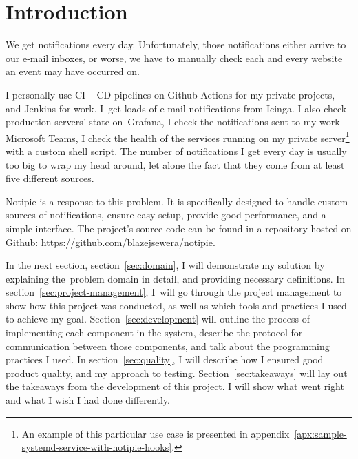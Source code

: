 \section{Introduction}\label{sec:introduction}

We get notifications every day.
Unfortunately,
those notifications either arrive
to our e-mail inboxes,
or worse,
we have to manually check
each and every website an event may have occurred on.

I personally use \ac{CI} -- \ac{CD} pipelines
on Github Actions for my private projects,
and Jenkins for work.
I~get loads of e-mail notifications from Icinga.
I also check production servers' state on~Grafana,
I check the notifications sent to my work Microsoft Teams,
I check the health of the services
running on my private server\footnote{
  An example of this particular use case
  is presented in appendix~\ref{apx:sample-systemd-service-with-notipie-hooks}.
} with a custom shell script.
The number of notifications I get every day
is usually too big to wrap my head around,
let alone the fact
that they come from at least five different sources.

Notipie is a response to this problem.
It is specifically designed
to handle custom sources of notifications,
ensure easy setup,
provide good performance,
and a simple interface.
The project's source code can be found
in a repository hosted
on Github: \url{https://github.com/blazejsewera/notipie}.

In the next section,
section~\ref{sec:domain},
I will demonstrate my solution
by explaining the~problem domain in detail,
and providing necessary definitions.
In section~\ref{sec:project-management},
I~will go through
the project management
to show how this project was conducted,
as well as which tools and practices
I used to achieve my goal.
Section~\ref{sec:development}
will outline the process of implementing
each component in the system,
describe the protocol for communication
between those components,
and talk about the programming practices I used.
In section~\ref{sec:quality},
I will describe how I ensured
good product quality,
and my approach to testing.
Section~\ref{sec:takeaways}
will lay out the takeaways from the development
of this project.
I will show what went right
and what I wish I had done differently.



